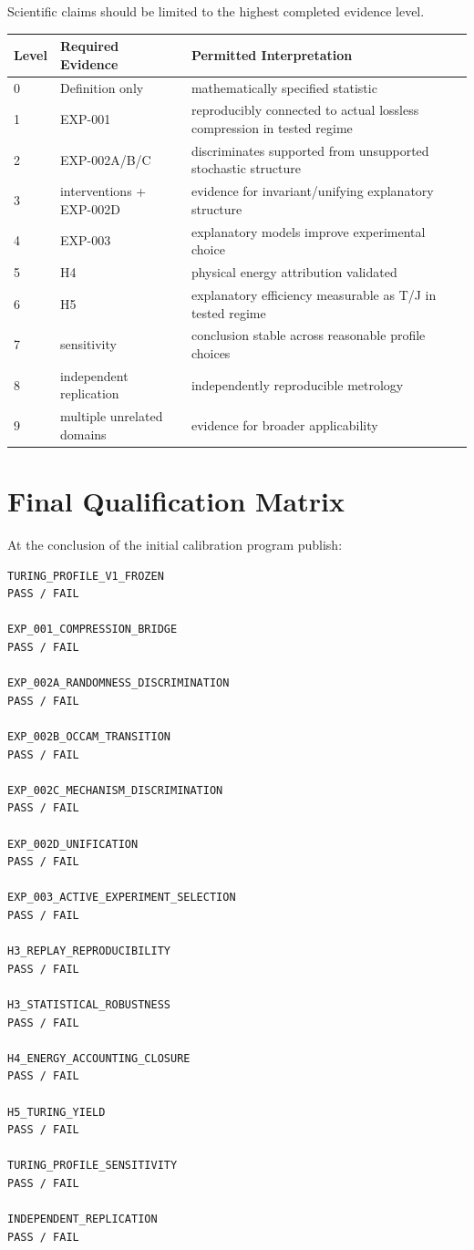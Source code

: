 \documentclass[11pt]{article}
\begin{document}
Scientific claims should be limited to the highest completed evidence level.

\begin{center}
\begin{tabular}{lll}
\toprule
Level & Required Evidence & Permitted Interpretation \\
\midrule
0 & Definition only & mathematically specified statistic \\
1 & EXP-001 & reproducibly connected to actual lossless compression in tested regime \\
2 & EXP-002A/B/C & discriminates supported from unsupported stochastic structure \\
3 & interventions + EXP-002D & evidence for invariant/unifying explanatory structure \\
4 & EXP-003 & explanatory models improve experimental choice \\
5 & H4 & physical energy attribution validated \\
6 & H5 & explanatory efficiency measurable as T/J in tested regime \\
7 & sensitivity & conclusion stable across reasonable profile choices \\
8 & independent replication & independently reproducible metrology \\
9 & multiple unrelated domains & evidence for broader applicability \\
\bottomrule
\end{tabular}
\end{center}

\section{Final Qualification Matrix}

At the conclusion of the initial calibration program publish:
\begin{verbatim}
TURING_PROFILE_V1_FROZEN
PASS / FAIL

EXP_001_COMPRESSION_BRIDGE
PASS / FAIL

EXP_002A_RANDOMNESS_DISCRIMINATION
PASS / FAIL

EXP_002B_OCCAM_TRANSITION
PASS / FAIL

EXP_002C_MECHANISM_DISCRIMINATION
PASS / FAIL

EXP_002D_UNIFICATION
PASS / FAIL

EXP_003_ACTIVE_EXPERIMENT_SELECTION
PASS / FAIL

H3_REPLAY_REPRODUCIBILITY
PASS / FAIL

H3_STATISTICAL_ROBUSTNESS
PASS / FAIL

H4_ENERGY_ACCOUNTING_CLOSURE
PASS / FAIL

H5_TURING_YIELD
PASS / FAIL

TURING_PROFILE_SENSITIVITY
PASS / FAIL

INDEPENDENT_REPLICATION
PASS / FAIL
\end{verbatim}
\end{document}
